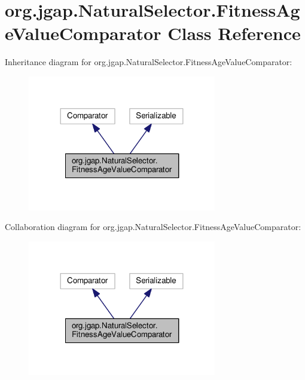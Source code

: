 \hypertarget{classorg_1_1jgap_1_1_natural_selector_1_1_fitness_age_value_comparator}{\section{org.\-jgap.\-Natural\-Selector.\-Fitness\-Age\-Value\-Comparator Class Reference}
\label{classorg_1_1jgap_1_1_natural_selector_1_1_fitness_age_value_comparator}
}


Inheritance diagram for org.\-jgap.\-Natural\-Selector.\-Fitness\-Age\-Value\-Comparator\-:
\nopagebreak
\begin{figure}[H]
\begin{center}
\leavevmode
\includegraphics[width=233pt]{classorg_1_1jgap_1_1_natural_selector_1_1_fitness_age_value_comparator__inherit__graph}
\end{center}
\end{figure}


Collaboration diagram for org.\-jgap.\-Natural\-Selector.\-Fitness\-Age\-Value\-Comparator\-:
\nopagebreak
\begin{figure}[H]
\begin{center}
\leavevmode
\includegraphics[width=233pt]{classorg_1_1jgap_1_1_natural_selector_1_1_fitness_age_value_comparator__coll__graph}
\end{center}
\end{figure}

